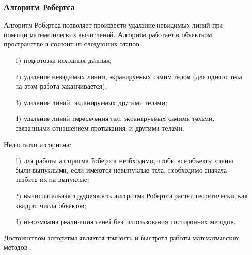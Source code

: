 \documentclass[54pt, a4paper]{article}
\begin{document}
	\subsubsection{Алгоритм Робертса}
	Алгоритм Робертса позволяет произвести удаление невидимых линий при помощи математических вычислений. Алгоритм работает в объектном пространстве и состоит из следующих этапов: 
	\begin{enumerate}
		\item[1)]подготовка исходных данных;
		\item[2)]удаление невидимых линий, экранируемых самим телом (для одного тела на этом работа заканчивается);
		\item[3)]удаление линий, экранируемых другими телами;
		\item[4)]удаление линий пересечения тел, экранируемых самими телами, связанными отношением протыкания, и другими телами.
	\end{enumerate}

	Недостатки алгоритма:
	\begin{enumerate}
		\item[1)]для работы алгоритма Робертса необходимо, чтобы все объекты сцены были выпуклыми, если имеются невыпуклые тела, необходимо сначала разбить их на выпуклые;
		\item[2)]вычислительная трудоемкость алгоритма Робертса растет теоретически, как квадрат числа объектов; 
		\item[3)]невозможна реализация теней без использования посторонних методов.
	\end{enumerate}

	Достоинством алгоритма является  точность и быстрота работы математических методов \cite{kur}.
\end{document}
